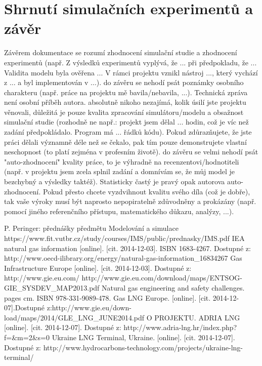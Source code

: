 \documentclass[a4paper,11pt]{article}
\begin{document}
\section{Shrnutí simulačních experimentů a závěr}

Závěrem dokumentace se rozumí zhodnocení simulační studie a zhodnocení experimentů (např. Z výsledků experimentů vyplývá, že ... při předpokladu, že ... Validita modelu byla ověřena ... V rámci projektu vznikl nástroj ..., který vychází z ... a byl implementován v ...).
do závěru se nehodí psát poznámky osobního charakteru (např. práce na projektu mě bavila/nebavila, ...). Technická zpráva není osobní příběh autora.
absolutně nikoho nezajímá, kolik úsilí jste projektu věnovali, důležitá je pouze kvalita zpracování simulátoru/modelu a obsažnost simulační studie (rozhodně ne např.: projekt jsem dělal ... hodin, což je víc než zadání předpokládalo. Program má ... řádků kódu). Pokud zdůrazňujete, že jste práci dělali významně déle než se čekalo, pak tím pouze demonstrujete vlastní neschopnost (to platí zejména v profesním životě).
do závěru se velmi nehodí psát "auto-zhodnocení" kvality práce, to je výhradně na recenzentovi/hodnotiteli (např. v projektu jsem zcela splnil zadání a domnívám se, že můj model je bezchybný a výsledky taktéž). Statisticky častý je pravý opak autorova auto-zhodnocení. Pokud přesto chcete vyzdvihnout kvalitu svého díla (což je dobře), tak vaše výroky musí být naprosto nepopiratelně zdůvodněny a prokázány (např. pomocí jiného referenčního přístupu, matematického důkazu, analýzy, ...).


\newpage
\renewcommand{\refname}{Literatura a použité zdroje}
\begin{thebibliography}{99}
P. Peringer: přednášky předmětu Modelování a simulace
https://www.fit.vutbr.cz/study/courses/IMS/public/prednasky/IMS.pdf	
 IEA natural gas information [online]. [cit. 2014-12-03]. ISBN 1683-4267. Dostupné z: http://www.oecd-ilibrary.org/energy/natural-gas-information{\_}16834267
 Gas Infrastructure Europe [online]. [cit. 2014-12-03]. Dostupné z: http://www.gie.eu.com/
 http://www.gie.eu.com/download/maps/ENTSOG-GIE{\_}SYSDEV{\_}MAP2013.pdf
 Natural gas engineering and safety challenges. pages cm. ISBN 978-331-9089-478.
Gas LNG Europe. [online]. [cit. 2014-12-07].Dostupné z:http://www.gie.eu/down-
load/maps/2014/GLE{\_}LNG{\_}JUNE2014.pdf
O PROJEKTU. ADRIA LNG [online]. [cit. 2014-12-07]. Dostupné z: http://www.adria-lng.hr/index.php?f={\&}m=2{\&}s=0
Ukraine LNG Terminal, Ukraine. [online]. [cit. 2014-12-07]. Dostupné z: http://www.hydrocarbons-technology.com/projects/ukraine-lng-terminal/
\end{thebibliography}
\end{document}
